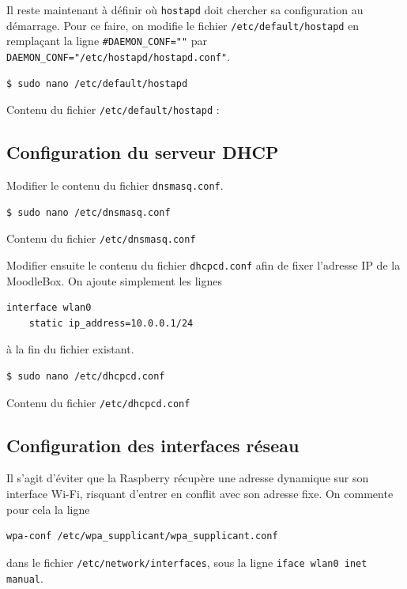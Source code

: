 \documentclass[11pt]{article}
\begin{document}
Il reste maintenant à définir où \lstinline{hostapd} doit chercher sa configuration au démarrage. Pour ce faire, on modifie le fichier \lstinline{/etc/default/hostapd} en remplaçant la ligne \lstinline{#DAEMON_CONF=""} par \lstinline{DAEMON_CONF="/etc/hostapd/hostapd.conf"}.

\begin{lstlisting}[language=bash]
$ sudo nano /etc/default/hostapd
\end{lstlisting}

Contenu du fichier \lstinline{/etc/default/hostapd} :



\subsection{Configuration du serveur DHCP}

Modifier le contenu du fichier \lstinline{dnsmasq.conf}.

\begin{lstlisting}[language=bash]
$ sudo nano /etc/dnsmasq.conf
\end{lstlisting}

Contenu du fichier \lstinline{/etc/dnsmasq.conf}



Modifier ensuite le contenu du fichier \lstinline{dhcpcd.conf} afin de fixer l'adresse IP de la MoodleBox. On ajoute simplement les lignes
\begin{lstlisting}[language=bash]
interface wlan0
    static ip_address=10.0.0.1/24
\end{lstlisting}
à la fin du fichier existant.

\begin{lstlisting}[language=bash]
$ sudo nano /etc/dhcpcd.conf
\end{lstlisting}

Contenu du fichier \lstinline{/etc/dhcpcd.conf}




\subsection{Configuration des interfaces réseau}

Il s'agit d'éviter que la Raspberry récupère une adresse dynamique sur son interface Wi-Fi, risquant d'entrer en conflit avec son adresse fixe. On commente pour cela la ligne
\begin{lstlisting}[language=bash]
wpa-conf /etc/wpa_supplicant/wpa_supplicant.conf
\end{lstlisting}
dans le fichier \lstinline{/etc/network/interfaces}, sous la ligne \lstinline{iface wlan0 inet manual}.
\end{document}
